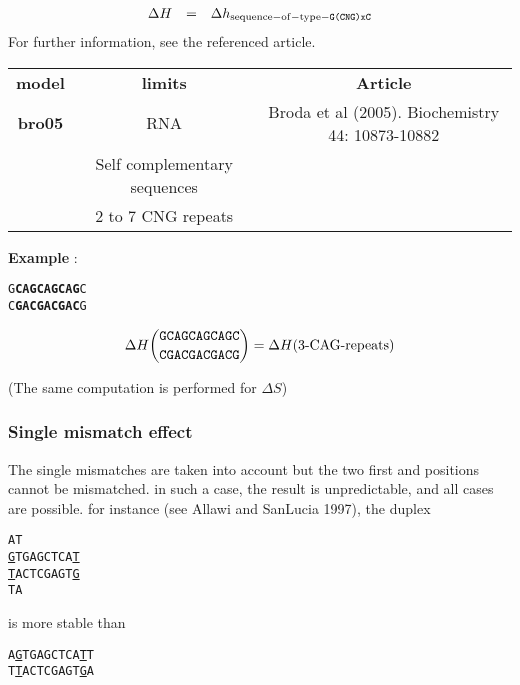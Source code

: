 \documentclass{article}
\begin{document}
\begin{displaymath}
  \begin{array}[t]{ccc}
  \Delta{}H&=&\Delta{}h_\mathrm{sequence-of-type-\texttt{G(CNG)xC}}\\
  \end{array}
\end{displaymath}
For further information, see the referenced article.

\begin{table}[h]
\begin{tabular}[h]{| c | c | c |}
\textbf{model} & \textbf{limits} & \textbf{Article} \\
\textbf{bro05} & RNA & Broda et al (2005). Biochemistry 44: 10873-10882 \\
 & Self complementary sequences & \\
 & 2 to 7 CNG repeats & \\
\end{tabular}
\end{table}


\textbf{Example} :
\begin{alltt}
G\textbf{CAGCAGCAG}C
C\textbf{GACGACGAC}G
\end{alltt}

\begin{multline*}
\Delta H {\mbox{\texttt{GCAGCAGCAGC}} \choose \mbox{\texttt{CGACGACGACG}}} = 
\Delta H {(\mbox{3-CAG-repeats})}
\end{multline*}

       (The same computation is performed for $\Delta S$)

\subsubsection{Single mismatch effect}

The single mismatches are taken into account but the two first and positions cannot
be mismatched. in such a case, the result is unpredictable, and all cases are
possible. for instance (see Allawi and SanLucia 1997), the duplex
\begin{alltt}
A          T  
 \underline{G}TGAGCTCA\underline{T}  
 \underline{T}ACTCGAGT\underline{G}  
T          A   
\end{alltt}

is more stable than 

\begin{alltt}
A\underline{G}TGAGCTCA\underline{T}T 
T\underline{T}ACTCGAGT\underline{G}A 
\end{alltt}
\end{document}
